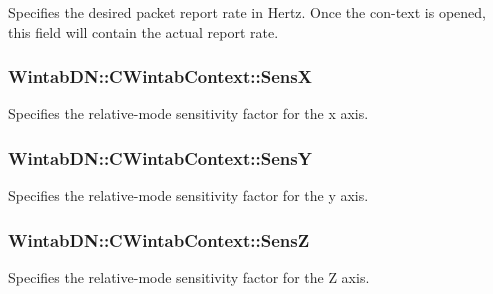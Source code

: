 Specifies the desired packet report rate in Hertz. Once the con-\/text is opened, this field will contain the actual report rate. 

\hypertarget{class_wintab_d_n_1_1_c_wintab_context_a07809637575a3df05e712040c0a3c724}{
\subsubsection[{SensX}]{ WintabDN::CWintabContext::SensX}}
\label{class_wintab_d_n_1_1_c_wintab_context_a07809637575a3df05e712040c0a3c724}


Specifies the relative-\/mode sensitivity factor for the x axis. 

\hypertarget{class_wintab_d_n_1_1_c_wintab_context_aa50f638174c4d1391705f2886f37c014}{
\subsubsection[{SensY}]{ WintabDN::CWintabContext::SensY}}
\label{class_wintab_d_n_1_1_c_wintab_context_aa50f638174c4d1391705f2886f37c014}


Specifies the relative-\/mode sensitivity factor for the y axis. 

\hypertarget{class_wintab_d_n_1_1_c_wintab_context_a7ff3ee5c5c7085f2f92235fffffa3cd8}{
\subsubsection[{SensZ}]{ WintabDN::CWintabContext::SensZ}}
\label{class_wintab_d_n_1_1_c_wintab_context_a7ff3ee5c5c7085f2f92235fffffa3cd8}


Specifies the relative-\/mode sensitivity factor for the Z axis. 

